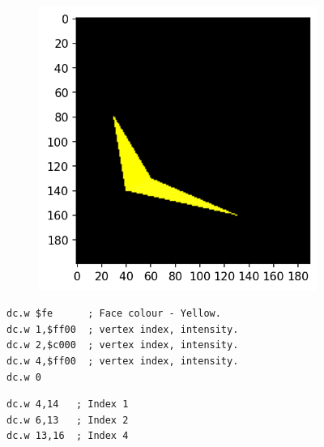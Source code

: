 \begin{figure}[H]
  \centering
  \begin{adjustbox}{width=13cm,center}
    \begin{minipage}[c]{0.48\linewidth}
      \begin{figure}[H]
        \centering
        \begin{adjustbox}{width=5.5cm,center}
          \includegraphics[width=12cm]{src/build_t2k_claws/claw_face_2.png}%
        \end{adjustbox}
      \end{figure}
    \end{minipage}
    \begin{minipage}[c]{0.48\linewidth}
      \begin{lstlisting}[basicstyle=\scriptsize\ttfamily]
dc.w $fe      ; Face colour - Yellow.
dc.w 1,$ff00  ; vertex index, intensity.
dc.w 2,$c000  ; vertex index, intensity.
dc.w 4,$ff00  ; vertex index, intensity.
dc.w 0
      \end{lstlisting}
      \begin{lstlisting}[basicstyle=\scriptsize\ttfamily]
dc.w 4,14   ; Index 1
dc.w 6,13   ; Index 2
dc.w 13,16  ; Index 4
      \end{lstlisting}
      \vspace*{\fill}
    \end{minipage}
  \end{adjustbox}
\end{figure}


